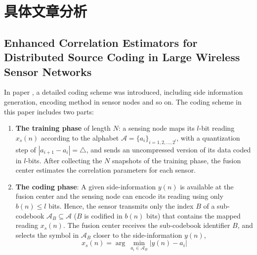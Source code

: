 \part{具体文章分析}

\chapter{Enhanced Correlation Estimators for Distributed Source Coding in Large Wireless Sensor Networks}
In paper \cite{Enric2012}, a detailed coding scheme was introduced, including side information generation, encoding method in sensor nodes and so on. The coding scheme in this paper includes two parts: 
\begin{enumerate}
    \item \textbf{\textcolor[rgb]{1,0,0}{The training phase}} of length $N$: a sensing node maps its $l$-bit reading $x_s(n)$ according to the alphabet $\mathcal{A} = \{ a_i \}_{i=1,2,\dots,2^l}$, with a quantization step of $\left| a_{i+1} - a_i \right| = \triangle$, and sends an uncompressed version of its data coded in $l$-bits. After collecting the $N$ snapshots of the training phase, the fusion center estimates the correlation parameters for each sensor.
    \item \textbf{\textcolor[rgb]{1,0,0}{The coding phase}}: A given side-information $y(n)$ is available at the fusion center and the sensing node can encode its reading using only $b(n) \leq l$ bits. Hence, the sensor transmits only the index $B$ of a sub-codebook $\mathcal{A}_B \subseteq \mathcal{A}$ ($B$ is codified in $b(n)$ bits) that contains the mapped reading $x_s(n)$. The fusion center receives the sub-codebook identifier $B$, and selects the symbol in $\mathcal{A}_B$ closer to the side-information $y(n)$,
        \begin{equation}
            x_s(n) = \arg\ \min_{a_i \in \mathcal{A}_B} \left| y(n)-a_i \right|
            \label{eq-subcode}
        \end{equation}
\end{enumerate}

